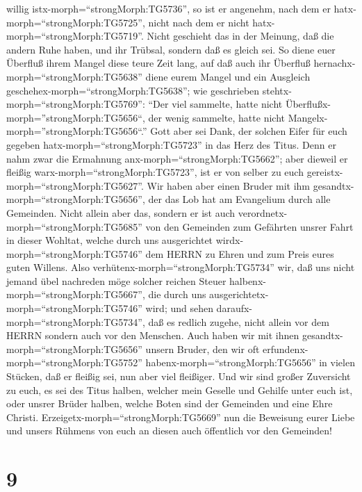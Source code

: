 willig istx-morph=``strongMorph:TG5736'', so ist er angenehm, nach dem
er hatx-morph=``strongMorph:TG5725'', nicht nach dem er nicht
hatx-morph=``strongMorph:TG5719''.  Nicht geschieht das in
der Meinung, daß die andern Ruhe haben, und ihr Trübsal, sondern daß es
gleich sei.  So diene euer Überfluß ihrem Mangel diese
teure Zeit lang, auf daß auch ihr Überfluß
hernachx-morph=``strongMorph:TG5638'' diene eurem Mangel und ein
Ausgleich geschehex-morph=``strongMorph:TG5638'';  wie
geschrieben stehtx-morph=``strongMorph:TG5769'': ``Der viel sammelte,
hatte nicht Überflußx-morph=''strongMorph:TG5656``, der wenig sammelte,
hatte nicht Mangelx-morph=''strongMorph:TG5656``.''  Gott
aber sei Dank, der solchen Eifer für euch gegeben
hatx-morph=``strongMorph:TG5723'' in das Herz des Titus. 
Denn er nahm zwar die Ermahnung anx-morph=``strongMorph:TG5662''; aber
dieweil er fleißig warx-morph=``strongMorph:TG5723'', ist er von selber
zu euch gereistx-morph=``strongMorph:TG5627''.  Wir haben
aber einen Bruder mit ihm gesandtx-morph=``strongMorph:TG5656'', der das
Lob hat am Evangelium durch alle Gemeinden.  Nicht allein
aber das, sondern er ist auch verordnetx-morph=``strongMorph:TG5685''
von den Gemeinden zum Gefährten unsrer Fahrt in dieser Wohltat, welche
durch uns ausgerichtet wirdx-morph=``strongMorph:TG5746'' dem HERRN zu
Ehren und zum Preis eures guten Willens.  Also
verhütenx-morph=``strongMorph:TG5734'' wir, daß uns nicht jemand übel
nachreden möge solcher reichen Steuer
halbenx-morph=``strongMorph:TG5667'', die durch uns
ausgerichtetx-morph=``strongMorph:TG5746'' wird;  und sehen
daraufx-morph=``strongMorph:TG5734'', daß es redlich zugehe, nicht
allein vor dem HERRN sondern auch vor den Menschen.  Auch
haben wir mit ihnen gesandtx-morph=``strongMorph:TG5656'' unsern Bruder,
den wir oft erfundenx-morph=``strongMorph:TG5752''
habenx-morph=``strongMorph:TG5656'' in vielen Stücken, daß er fleißig
sei, nun aber viel fleißiger.  Und wir sind großer
Zuversicht zu euch, es sei des Titus halben, welcher mein Geselle und
Gehilfe unter euch ist, oder unsrer Brüder halben, welche Boten sind der
Gemeinden und eine Ehre Christi. 
Erzeigetx-morph=``strongMorph:TG5669'' nun die Beweisung eurer Liebe und
unsers Rühmens von euch an diesen auch öffentlich vor den Gemeinden!

\hypertarget{section-8}{%
\section{9}\label{section-8}}

